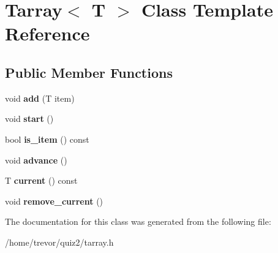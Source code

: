 \hypertarget{class_tarray}{}\section{Tarray$<$ T $>$ Class Template Reference}
\label{class_tarray}
\subsection*{Public Member Functions}
\begin{DoxyCompactItemize}
\item 
void {\bfseries add} (T item)\hypertarget{class_tarray_a973a89fb0a3fe40c1680f6cae63981ad}{}\label{class_tarray_a973a89fb0a3fe40c1680f6cae63981ad}

\item 
void {\bfseries start} ()\hypertarget{class_tarray_afdf48d2a03b6b1c110818998b6a86a38}{}\label{class_tarray_afdf48d2a03b6b1c110818998b6a86a38}

\item 
bool {\bfseries is\+\_\+item} () const \hypertarget{class_tarray_a6156cd5b6fe7260b09a8e9dc12325f45}{}\label{class_tarray_a6156cd5b6fe7260b09a8e9dc12325f45}

\item 
void {\bfseries advance} ()\hypertarget{class_tarray_a5bd5dd08f5bfe1c2a5dab59ad7896ecf}{}\label{class_tarray_a5bd5dd08f5bfe1c2a5dab59ad7896ecf}

\item 
T {\bfseries current} () const \hypertarget{class_tarray_a67ee009254a937831e07ab0701c696de}{}\label{class_tarray_a67ee009254a937831e07ab0701c696de}

\item 
void {\bfseries remove\+\_\+current} ()\hypertarget{class_tarray_af1728e8ed47a8de0fd3eedfa526b0c43}{}\label{class_tarray_af1728e8ed47a8de0fd3eedfa526b0c43}

\end{DoxyCompactItemize}


The documentation for this class was generated from the following file\+:\begin{DoxyCompactItemize}
\item 
/home/trevor/quiz2/tarray.\+h\end{DoxyCompactItemize}
